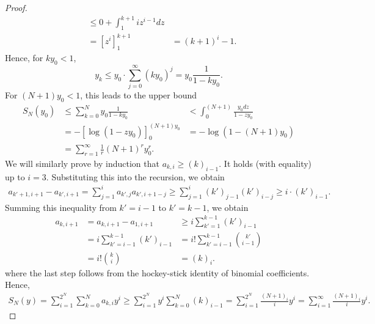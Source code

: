 \documentclass[10pt,a4paper]{amsart}
\begin{document}
\begin{proof}
\begin{eqnarray*}
        &\le 0+\int_1^{k+1} iz^{i-1}dz\\
        &=[z^i]_1^{k+1}
        &=(k+1)^i-1.
    \end{eqnarray*}
    Hence, for $ky_0<1$, 
    \[
    y_k\le y_0\cdot \sum_{j=0}^\infty(ky_0)^j=y_0\frac{1}{1-ky_0}.
    \]
    For $(N+1)y_0<1$, this leads to the upper bound
    \begin{eqnarray*}
    S_N(y_0)&\le\sum_{k=0}^Ny_0\frac{1}{1-ky_0}
    &<\int_{0}^{(N+1)}\frac{y_0dz}{1-zy_0}\\
    &=-\left[\log(1-zy_0)\right]_0^{(N+1)y_0}
    &=-\log(1-(N+1)y_0)\\
    &=\sum_{r=1}^\infty\frac1r(N+1)^ry_0^r.
    \end{eqnarray*}
    We will similarly prove by induction that $a_{k,i}\ge(k)_{i-1}$.
    It holds (with equality) up to $i=3$. Substituting this into the recursion, we obtain
    \begin{align*}
    a_{k'+1,i+1}-a_{k',i+1}=\sum_{j=1}^ia_{k',j}a_{k',i+1-j}
    \ge\sum_{j=1}^i(k')_{j-1}(k')_{i-j}
    \ge i\cdot (k')_{i-1}.
    \end{align*}
    Summing this inequality from $k'=i-1$ to $k'=k-1$, we obtain
    \begin{eqnarray*}
        a_{k,i+1}&=a_{k,i+1}-a_{1,i+1}&\ge i\sum_{k'=1}^{k-1}(k')_{i-1}\\
        &=i\sum_{k'=i-1}^{k-1}(k')_{i-1}
        &=i!\sum_{k'=i-1}^{k-1}{k'\choose i-1}\\
        &=i!{k\choose i}&=(k)_i.
    \end{eqnarray*}
    where the last step follows from the hockey-stick identity of binomial coefficients.
    Hence,
    \begin{eqnarray*}
    S_N(y)= \sum_{i=1}^{2^N}\sum_{k=0}^Na_{k,i}y^i
    \ge \sum_{i=1}^{2^N}y^i\sum_{k=0}^N(k)_{i-1}
    =\sum_{i=1}^{2^N}\frac{(N+1)_i}{i}y^i
    =\sum_{i=1}^\infty\frac{(N+1)_i}{i}y^i.
    \end{eqnarray*}
\end{proof}
\end{document}
